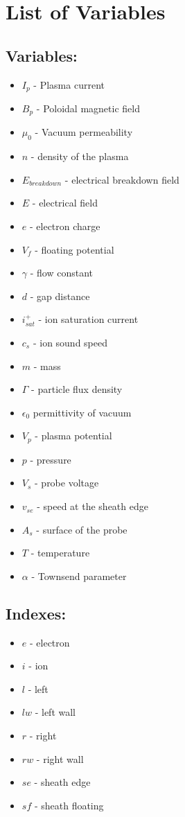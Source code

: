 \chapter*{List of Variables}
\begin{multicols}{2}
\section*{Variables:}
\begin{itemize}
\item $I_p$ - Plasma current
\item $B_p$ - Poloidal magnetic field
\item $\mu_0$ - Vacuum permeability
\item $n$ - density of the plasma
\item $E_{breakdown}$ - electrical breakdown field
\item $E$ - electrical field
\item $e$ - electron charge
\item $V_f$ - floating potential
\item $\gamma$ - flow constant
\item $d$ - gap distance
\item $i^+_{sat}$ - ion saturation current
\item $c_s$ - ion sound speed
\item $m$ - mass 
\item $\Gamma$ - particle flux density
\item $\epsilon_0$ permittivity of vacuum
\item $V_p$ - plasma potential 
\item $p$ - pressure
\item $V_s$ - probe voltage
\item $v_{se}$ - speed at the sheath edge
\item $A_s$ - surface of the probe
\item $T$ - temperature
\item $\alpha$ - Townsend parameter
\end{itemize}

\section*{Indexes:}
\begin{itemize}
\item $e$ - electron
\item $i$ - ion
\item $l$ - left
\item $lw$ - left wall
\item $r$ - right
\item $rw$ - right wall
\item $se$ - sheath edge
\item $sf$ - sheath floating
\end{itemize}
\end{multicols}